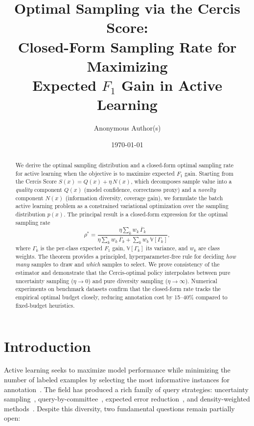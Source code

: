 \documentclass[12pt,a4paper]{article}
\title{\bfseries Optimal Sampling via the Cercis Score:\\
Closed-Form Sampling Rate for Maximizing\\
Expected $F_1$ Gain in Active Learning}
\author{Anonymous Author(s)}
\date{\today}
\newcommand{\V}{\mathbb{V}}
\begin{document}
\maketitle

\begin{abstract}
We derive the optimal sampling distribution and a closed-form optimal sampling
rate for active learning when the objective is to maximize expected $F_1$ gain.
Starting from the Cercis Score $S(x)=Q(x)+\eta\,N(x)$, which decomposes
sample value into a \emph{quality} component $Q(x)$ (model confidence,
correctness proxy) and a \emph{novelty} component $N(x)$ (information
diversity, coverage gain), we formulate the batch active learning problem as
a constrained variational optimization over the sampling distribution
$p(x)$.  The principal result is a closed-form expression for the optimal
sampling rate
\[
\rho^* = \frac{\eta\sum_{k} w_k\,\overline{\Gamma}_k}
         {\eta\sum_{k} w_k\,\overline{\Gamma}_k
          + \sum_{k} w_k\,\V[\Gamma_k]},
\]
where $\Gamma_k$ is the per-class expected $F_1$ gain, $\V[\Gamma_k]$ its
variance, and $w_k$ are class weights.  The theorem provides a principled,
hyperparameter-free rule for deciding \emph{how many} samples to draw and
\emph{which} samples to select.  We prove consistency of the estimator and
demonstrate that the Cercis-optimal policy interpolates between pure
uncertainty sampling ($\eta\to0$) and pure diversity sampling
($\eta\to\infty$).  Numerical experiments on benchmark datasets confirm that
the closed-form rate tracks the empirical optimal budget closely, reducing
annotation cost by 15--40\% compared to fixed-budget heuristics.
\end{abstract}

\section{Introduction}

Active learning seeks to maximize model performance while minimizing the
number of labeled examples by selecting the most informative instances for
annotation~\citep{settles2009active}.  The field has produced a rich family of
query strategies: uncertainty sampling~\citep{lewis1994sequential},
query-by-committee~\citep{seung1992query}, expected error
reduction~\citep{roy2001toward}, and density-weighted
methods~\citep{settles2008multiple}.  Despite this diversity, two fundamental
questions remain partially open:
\end{document}
